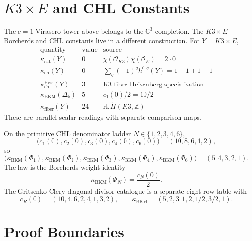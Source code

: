 \documentclass[11pt]{article}
\begin{document}
\section{$K3\times E$ and CHL Constants}

The $c=1$ Virasoro tower above belongs to the $\mathbb C^3$ completion.
The $K3\times E$ Borcherds and CHL constants live in a different
construction. For $Y=K3\times E$,
\[
\begin{array}{c|c|c}
\text{quantity} & \text{value} & \text{source}\\
\hline
\kappa_{\mathrm{cat}}(Y) & 0 &
\chi(\mathcal O_{K3})\chi(\mathcal O_E)=2\cdot0\\
\kappa_{\mathrm{ch}}(Y) & 0 &
\sum_q(-1)^qh^{0,q}(Y)=1-1+1-1\\
\kappa_{\mathrm{ch}}^{\mathrm{Heis}}(Y) & 3 &
\text{K3-fibre Heisenberg specialisation}\\
\kappa_{\mathrm{BKM}}(\Delta_5) & 5 &
c_1(0)/2=10/2\\
\kappa_{\mathrm{fiber}}(Y) & 24 &
\mathrm{rk}\,\widetilde H(K3,\mathbb Z)
\end{array}
\]
These are parallel scalar readings with separate comparison maps.

On the primitive CHL denominator ladder
$N\in\{1,2,3,4,6\}$,
\[
  \bigl(c_1(0),c_2(0),c_3(0),c_4(0),c_6(0)\bigr)
  =(10,8,6,4,2),
\]
so
\[
  \bigl(\kappa_{\mathrm{BKM}}(\Phi_1),
        \kappa_{\mathrm{BKM}}(\Phi_2),
        \kappa_{\mathrm{BKM}}(\Phi_3),
        \kappa_{\mathrm{BKM}}(\Phi_4),
        \kappa_{\mathrm{BKM}}(\Phi_6)\bigr)
  =(5,4,3,2,1).
\]
The law is the Borcherds weight identity
\[
  \kappa_{\mathrm{BKM}}(\Phi_N)=\frac{c_N(0)}2.
\]
The Gritsenko-Clery diagonal-divisor catalogue is a separate
eight-row table with
\[
  c_R(0)=(10,4,6,2,4,1,3,2),\qquad
  \kappa_{\mathrm{BKM}}=(5,2,3,1,2,1/2,3/2,1).
\]

\section{Proof Boundaries}
\end{document}
